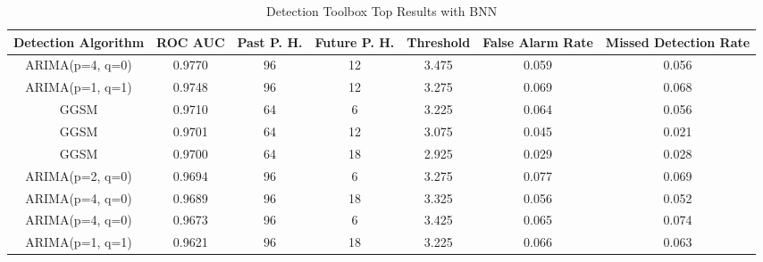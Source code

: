 \begin{table*}[h!]
\centering
\caption{Detection Toolbox Top Results with BNN}
    \label{table:bnnexperimenttwotop3}
    \begin{tabular}{|c|c|c|c|c|c|c|}
        \hline
        Detection Algorithm & ROC AUC & Past P. H. & Future P. H. & Threshold & False Alarm Rate & Missed Detection Rate \\
        \hline
        \hline
        ARIMA(p=4, q=0) & 0.9770 & 96 & 12 & 3.475 &  0.059 & 0.056 \\
        \hline
        ARIMA(p=1, q=1) & 0.9748 & 96 & 12 & 3.275 &  0.069 & 0.068 \\
        \hline
        GGSM & 0.9710 & 64 & 6 & 3.225 &  0.064 & 0.056 \\
        \hline
        GGSM & 0.9701 & 64 & 12 & 3.075 &  0.045 & 0.021 \\
        \hline
        GGSM & 0.9700 & 64 & 18 & 2.925 &  0.029 & 0.028 \\
        \hline
        ARIMA(p=2, q=0) & 0.9694 & 96 & 6 & 3.275 &  0.077 & 0.069 \\
        \hline
        ARIMA(p=4, q=0) & 0.9689 & 96 & 18 & 3.325 &  0.056 & 0.052 \\
        \hline
        ARIMA(p=4, q=0) & 0.9673 & 96 & 6 & 3.425 &  0.065 & 0.074 \\
        \hline
        ARIMA(p=1, q=1) & 0.9621 & 96 & 18 & 3.225 &  0.066 & 0.063 \\
        \hline
    \end{tabular}
\end{table*}
